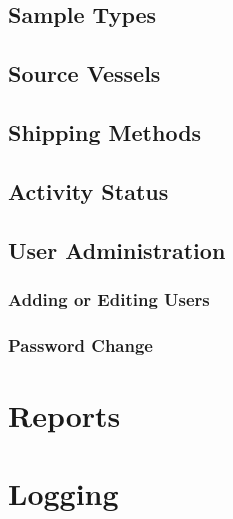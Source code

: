 \section{Sample Types}
\section{Source Vessels}
\section{Shipping Methods}
\section{Activity Status}
\section{User Administration}
\subsection{Adding or Editing Users}
\subsection{Password Change}
\chapter{Reports}
\chapter{Logging}
